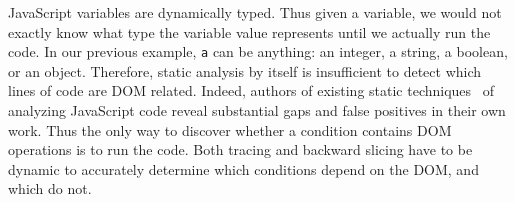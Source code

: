 JavaScript variables are dynamically typed.  Thus given a variable, we would not exactly know what type the variable value represents until we actually run the code.  
In our previous example, {\tt a} can be anything: an integer, a string, a boolean, or an object.  
Therefore, static analysis by itself is insufficient to detect which lines of code are DOM related.  
Indeed, authors of existing static techniques~\cite{staticJsWWW09, staticJsWWW11} of analyzing JavaScript code reveal substantial gaps and false positives in their own work.  
Thus the only way to discover whether a condition contains DOM operations is to run the code.  
Both tracing and backward slicing have to be dynamic to accurately determine which conditions depend on the DOM, and which do not.  


